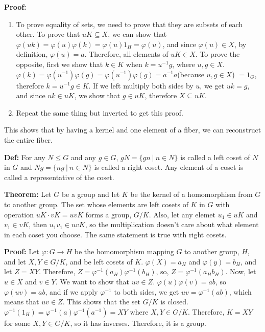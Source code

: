 \documentclass{article}
\begin{document}
\textbf{Proof:}
\begin{enumerate}
    \item To prove equality of sets, we need to prove that they are subsets of each other. To prove that $uK \subseteq X$, we can show that $\varphi (uk) = \varphi (u) \varphi (k) = \varphi (u) 1_H = \varphi (u)$, and since $\varphi (u) \in X$, by definition, $\varphi (u) = a$. Therefore, all elements of $uK \in X$. To prove the opposite, first we show that $k \in K$ when $k = u^{-1} g$, where $u,g \in X$. $\varphi (k) = \varphi (u^{-1}) \varphi (g) = \varphi (u^{-1}) \varphi(g) = a^{-1} a $(because $u,g \in X$) $ = 1_G$, therefore $k = u^{-1}g \in K$. If we left multiply both sides by $u$, we get $uk = g$, and since $uk \in uK$, we show that $g \in uK$, therefore $X \subseteq uK$.
    \item Repeat the same thing but inverted to get this proof. 
\end{enumerate}

This shows that by having a kernel and one element of a fiber, we can reconstruct the entire fiber.

\textbf{Def:} For any $N \leq G$ and any $g \in G$, $gN = \{gn \: | \:  n \in N\}$ is called a left coset of $N$ in $G$ and $Ng = \{ng \: | \: n \in N \}$ is called a right coset. Any element of a coset is called a representative of the coset.

\textbf{Theorem:} Let $G$ be a group and let $K$ be the kernel of a homomorphism from $G$ to another group. The set whose elements are left cosets of $K$ in $G$ with operation $uK \cdot vK = uvK$ forms a group, $G/K$. Also, let any elemet $u_1 \in uK$ and $v_1 \in vK$, then $u_1 v_1 \in uvK$, so the multiplication doesn't care about what element in each coset you choose. The same statement is true with right cosets.

\textbf{Proof:} Let $\varphi : G \rightarrow H$ be the homomorphism mapping $G$ to another group, $H$, and let $X,Y \in G/K$, and be left cosets of $K$. $\varphi (X) = a_H$ and $\varphi (y) = b_H$, and let $Z = XY$. Therefore, $Z = \varphi ^{-1} (a_H) \varphi ^{-1} (b_H)$, so, $Z = \varphi ^{-1} (a_H b_H)$. Now, let $u \in X$ and $v \in Y$. We want to show that $uv \in Z$. $\varphi (u) \varphi (v) = ab$, so $\varphi (uv) = ab$, and if we apply $\varphi ^{-1}$ to both sides, we get $uv = \varphi ^{-1} (ab)$, which means that $uv \in Z$. This shows that the set $G/K$ is closed. $\varphi ^{-1}(1_H) = \varphi ^{-1} (a) \varphi ^{-1} (a ^{-1} ) = XY$ where $X,Y \in G/K$. Therefore, $K = XY$ for some $X, Y \in G/K$, so it has inverses. Therefore, it is a group.
\end{document}
